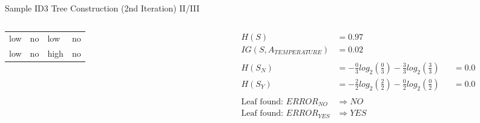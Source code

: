 \documentclass[document.tex]{subfiles}
\begin{document}
\begin{frame}{Sample ID3 Tree Construction (2nd Iteration) II/III}
\begin{columns}
\begin{column}{0.4\textwidth}
\begin{table}
{\begin{tabular}{llll}
                            \rowcolor{LightRed}
                            low &    no &         low &     no \\
                            \rowcolor{LightRed}
                            low &    no &        high &     no \\
                            \bottomrule
                        \end{tabular}
                    }
                \end{table}
                \vspace*{-6mm}
                \begin{table}
                    \caption*{\footnotesize Attribute $A=ERROR$, Sample $S_Y$ \normalsize}
                    \vspace*{-2mm}
                \end{table}
            \end{column}
            \begin{column}{0.6\textwidth}
                \begin{alignat*}{3}
                    H(S) &= 0.97 \\
                    IG(S, A_{TEMPERATURE}) &= 0.02 \\\\
                    H(S_N) &= -\frac{0}{3}log_2(\frac{0}{3}) - \frac{3}{3}log_2(\frac{3}{3}) &&= 0.0 \\
                    H(S_Y) &= -\frac{2}{2}log_2(\frac{2}{2}) - \frac{0}{2}log_2(\frac{0}{2}) &&= 0.0 \\\\
                    \text{Leaf found: } ERROR_{NO} &\Rightarrow NO \\
                    \text{Leaf found: } ERROR_{YES} &\Rightarrow YES
                \end{alignat*}
            \end{column}
        \end{columns}
    \end{frame}
    
\end{document}
